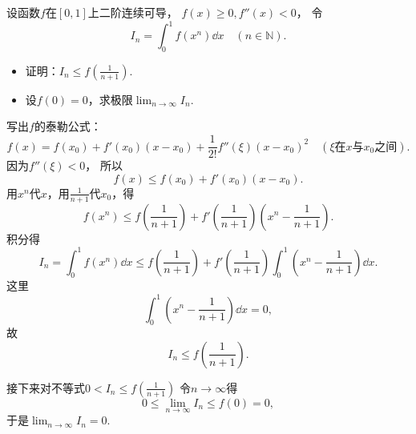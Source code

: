 \begin{example}
设函数\(f\)在\([0,1]\)上二阶连续可导，
\(f(x)\geq0,
f''(x)<0\)，
令\begin{equation*}
	I_n = \int_0^1 f(x^n) \dd{x}
	\quad(n\in\mathbb{N}).
\end{equation*}
\begin{itemize}
	\item 证明：\(I_n \leq f\left( \frac1{n+1} \right)\).
	\item 设\(f(0) = 0\)，求极限\(\lim_{n\to\infty} I_n\).
\end{itemize}
\begin{solution}
写出\(f\)的泰勒公式：\begin{equation*}
	f(x) = f(x_0) + f'(x_0) (x-x_0) + \frac1{2!} f''(\xi) (x-x_0)^2
	\quad(\text{$\xi$在$x$与$x_0$之间}).
\end{equation*}
因为\(f''(\xi)<0\)，
所以\begin{equation*}
	f(x) \leq f(x_0) + f'(x_0) (x-x_0).
\end{equation*}
用\(x^n\)代\(x\)，用\(\frac1{n+1}\)代\(x_0\)，得\begin{equation*}
	f(x^n)
	\leq
	f\left(\frac1{n+1}\right) + f'\left(\frac1{n+1}\right) \left(x^n-\frac1{n+1}\right).
\end{equation*}
积分得\begin{equation*}
	I_n = \int_0^1 f(x^n) \dd{x}
	\leq f\left(\frac1{n+1}\right)
	+ f'\left(\frac1{n+1}\right) \int_0^1 \left(x^n-\frac1{n+1}\right) \dd{x}.
\end{equation*}
这里\begin{equation*}
	\int_0^1 \left(x^n-\frac1{n+1}\right) \dd{x} = 0,
\end{equation*}
故\begin{equation*}
	I_n \leq f\left(\frac1{n+1}\right).
\end{equation*}

接下来对不等式\(0 < I_n \leq f\left(\frac1{n+1}\right)\)
令\(n\to\infty\)得\begin{equation*}
	0 \leq \lim_{n\to\infty} I_n \leq f(0) = 0,
\end{equation*}
于是\(\lim_{n\to\infty} I_n = 0\).
\end{solution}
\end{example}

